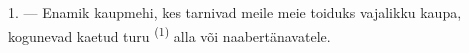 %
%
%
%
%
%

\VUsaut{4.0mm}
\VUsaut{3.0mm}

\VUsaut{3.0mm}

1. --- Enamik kaupmehi, kes tarnivad meile meie toiduks vajalikku kaupa, kogunevad
kaetud turu  \textsuperscript{(1)} alla või naabertänavatele.

